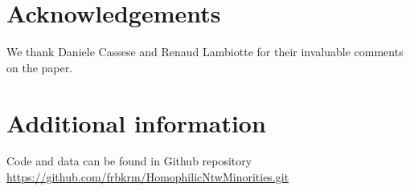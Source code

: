\documentclass[letterpaper,pdftex,twocolumn,amsmath,amssymb,groupedaddress,floatfix,superscriptaddress]{revtex4}
\begin{document}















%







\section*{\large Acknowledgements}
We thank Daniele Cassese and Renaud Lambiotte for their invaluable comments on the paper.
\section*{\large Additional information}
Code and data can be found in Github repository \url{https://github.com/frbkrm/HomophilicNtwMinorities.git}



\smallskip

\begin{appendices}
%
\cleardoublepage%
\let\clearpage\relax
%
%
%
%

%
%

%
%
\end{appendices}
\end{document}
